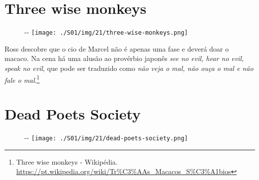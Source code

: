 \hypertarget{three-wise-monkeys}{%
\section{Three wise monkeys}\label{three-wise-monkeys}}

\begin{figure}[!ht]
  \begin{adjustwidth}{-\oddsidemargin-1in}{-\rightmargin}
    \centering
    \texttt{[image: ./S01/img/21/three-wise-monkeys.png]}
  \end{adjustwidth}
\end{figure}

Ross descobre que o cio de Marcel não é apenas uma fase e deverá doar o
macaco. Na cena há uma alusão ao provérbio japonês \emph{see no evil,
hear no evil, speak no evil}, que pode ser traduzido como \emph{não veja
o mal, não ouça o mal e não fale o mal}.\footnote{\sloppy Three wise monkeys - Wikipédia. \url{https://pt.wikipedia.org/wiki/Tr\%C3\%AAs_Macacos_S\%C3\%A1bios}}

\hypertarget{dead-poets-society}{%
\section{Dead Poets Society}\label{dead-poets-society}}

\begin{figure}[!ht]
  \begin{adjustwidth}{-\oddsidemargin-1in}{-\rightmargin}
    \centering
    \texttt{[image: ./S01/img/21/dead-poets-society.png]}
  \end{adjustwidth}
\end{figure}

